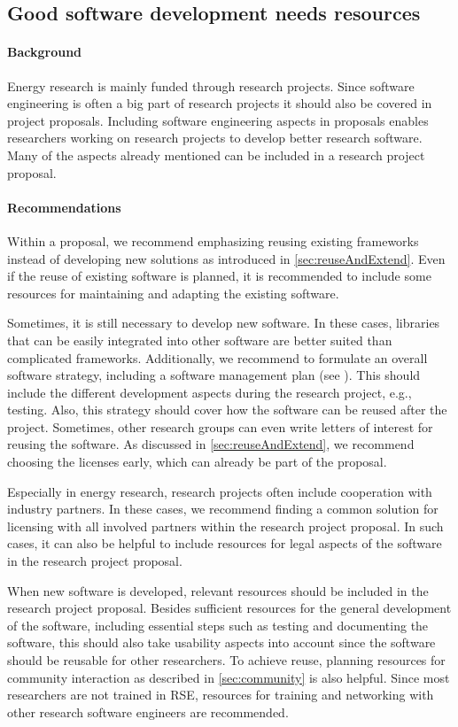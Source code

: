 \subsection{Good software development needs resources}\label{sec:proposal}

\paragraph{Background} Energy research is mainly funded through research projects. Since software engineering is often a big part of research projects it should also be covered in project proposals. Including software engineering aspects in proposals enables researchers working on research projects to develop better research software. Many of the aspects already mentioned can be included in a research project proposal.

\paragraph{Recommendations} Within a proposal, we recommend emphasizing reusing existing frameworks instead of developing new solutions as introduced in \ref{sec:reuseAndExtend}. Even if the reuse of existing software is planned, it is recommended to include some resources for maintaining and adapting the existing software.

Sometimes, it is still necessary to develop new software. In these cases, libraries that can be easily integrated into other software are better suited than complicated frameworks.
Additionally, we recommend
to formulate an overall software strategy, including a software management plan (see \cite{jackson_checklist_2018}). This should include the different development aspects during the research project, e.g., testing. Also, this strategy should cover how the software can be reused after the project. Sometimes, other research groups can even write letters of interest for reusing the software. As discussed in \ref{sec:reuseAndExtend}, we recommend choosing the licenses early, which can already be part of the proposal. 

Especially in energy research, research projects often include cooperation with industry partners. In these cases, we recommend finding a common solution for licensing with all involved partners within the research project proposal. In such cases, it can also be helpful to include resources for legal aspects of the software in the research project proposal.

When new software is developed, relevant resources should be included in the research project proposal. Besides sufficient resources for the general development of the software, including essential steps such as testing and documenting the software, this should also take usability aspects into account since the software should be reusable for other researchers. To achieve reuse, planning  resources for community interaction as described in \ref{sec:community} is also helpful.
Since most researchers are not trained in \ac{RSE}, resources for training and networking with other research software engineers are recommended. 

